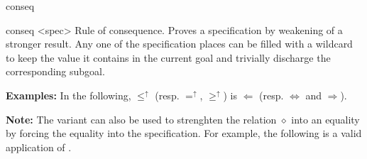 \begin{tactic}{conseq}
  \begin{tsyntax}{conseq <spec>}
  Rule of consequence. Proves a specification by weakening of a
  stronger result. Any one of the specification places can be filled
  with a wildcard \tct{_} to keep the value it contains in the current
  goal and trivially discharge the corresponding subgoal.

  \textbf{Examples:} In the following, $\leq^\uparrow$ (resp. $=^\uparrow$,
  $\geq^\uparrow$) is $\Leftarrow$ (resp. $\Leftrightarrow$ and
  $\Rightarrow$).

  \textbf{Note:} The \phl variant can also be used to strenghten the
  relation $\diamond$ into an equality by forcing the equality into
  the specification. For example, the following is a valid application
  of .
  \end{tsyntax}


\end{tactic}

